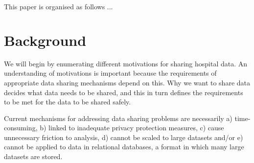 \documentclass[11pt]{article}
\begin{document}
This paper is organised as follows ...

\section{Background}



We will begin by enumerating different motivations for sharing hospital data. An understanding of motivations is important because the requirements of appropriate data sharing mechanisms depend on this. Why we want to share data decides what data needs to be shared, and this in turn defines the requirements to be met for the data to be shared safely.

Current mechanisms for addressing data sharing problems  are necessarily  a) time-consuming, b) linked to inadequate privacy protection measures, c) cause unnecessary friction to analysis, d) cannot be scaled to large datasets and/or e) cannot be applied to data in relational databases, a format in which many large datasets are stored.



\end{document}
